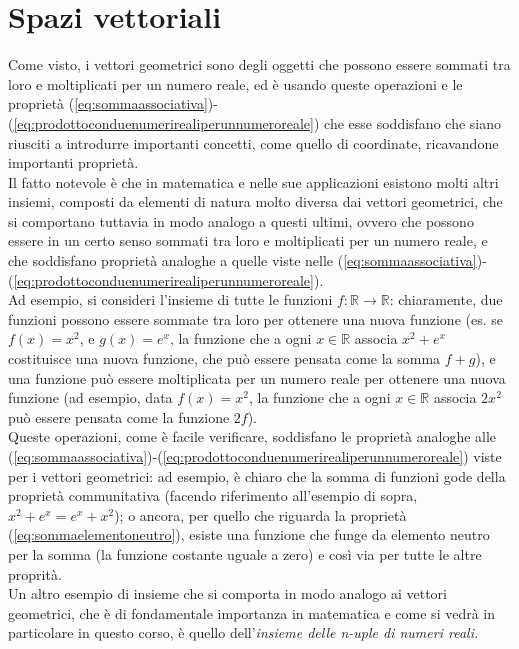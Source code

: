 \section{Spazi vettoriali}
\label{sec:spazivect}

Come visto, i vettori geometrici sono degli oggetti che possono essere sommati tra loro e moltiplicati per un numero reale, ed è usando queste operazioni e le proprietà (\ref{eq:sommaassociativa})-(\ref{eq:prodottoconduenumerirealiperunnumeroreale}) che esse soddisfano che siano riusciti a introdurre importanti concetti, come quello di coordinate, ricavandone importanti proprietà.\\
Il fatto notevole è che in matematica e nelle sue applicazioni esistono molti altri insiemi, composti da elementi di natura molto diversa dai vettori geometrici, che si comportano tuttavia in modo analogo a questi ultimi, ovvero che possono essere in un certo senso sommati tra loro e moltiplicati per un numero reale, e che soddisfano proprietà analoghe a quelle viste nelle (\ref{eq:sommaassociativa})-(\ref{eq:prodottoconduenumerirealiperunnumeroreale}).\\
Ad esempio, si consideri l'insieme di tutte le funzioni $f:\mathds{R}\to \mathds{R}$: chiaramente, due funzioni possono essere sommate tra loro per ottenere una nuova funzione (es. se $f(x)=x^2$, e $g(x)=e^x$, la funzione che a ogni $x\in \mathds{R}$ associa $x^2+e^x$ costituisce una nuova funzione, che può essere pensata come la somma $f+g$), e una funzione può essere moltiplicata per un numero reale per ottenere una nuova funzione (ad esempio, data $f(x)=x^2$, la funzione che a ogni $x\in \mathds{R}$ associa $2x^2$ può essere pensata come la funzione $2f$).\\
Queste operazioni, come è facile verificare, soddisfano le proprietà analoghe alle (\ref{eq:sommaassociativa})-(\ref{eq:prodottoconduenumerirealiperunnumeroreale}) viste per i vettori geometrici: ad esempio, è chiaro che la somma di funzioni gode della proprietà communitativa (facendo riferimento all'esempio di sopra, $x^2+e^x=e^x+x^2$); o ancora, per quello che riguarda la proprietà (\ref{eq:sommaelementoneutro}), esiste una funzione che funge da elemento neutro per la somma (la funzione costante uguale a zero) e così via per tutte le altre proprità.\\
Un altro esempio di insieme che si comporta in modo analogo ai vettori geometrici, che è di fondamentale importanza in matematica e come si vedrà in particolare in questo corso, è quello dell'\textit{insieme delle n-uple di numeri reali.}\\
